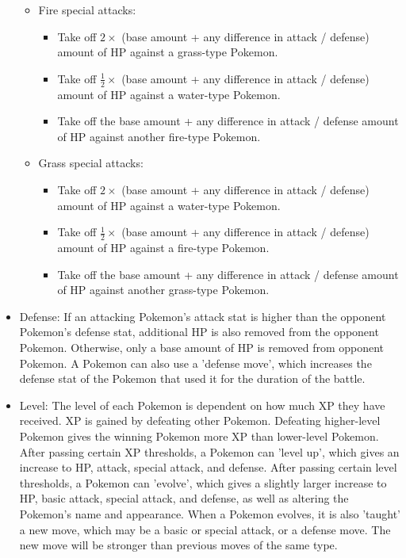 \documentclass{article}
\begin{document}
\begin{itemize}
\begin{itemize}
\begin{itemize}
          \end{itemize}
        \item Fire special attacks:
          \begin{itemize}
            \item Take off $2\times$ (base amount + any difference in attack / defense) amount of HP against a grass-type Pokemon.
            \item Take off $\frac{1}{2}\times{}$ (base amount + any difference in attack / defense) amount of HP against a water-type Pokemon.
            \item Take off the base amount + any difference in attack / defense amount of HP against another fire-type Pokemon.
          \end{itemize}
        \item Grass special attacks:
          \begin{itemize}
            \item Take off $2\times$ (base amount + any difference in attack / defense) amount of HP against a water-type Pokemon.
            \item Take off $\frac{1}{2}\times{}$ (base amount + any difference in attack / defense) amount of HP against a fire-type Pokemon.
            \item Take off the base amount + any difference in attack / defense amount of HP against another grass-type Pokemon.
          \end{itemize}
      \end{itemize}
    \item Defense: If an attacking Pokemon's attack stat is higher than the opponent Pokemon's defense stat, additional HP is also removed from the opponent Pokemon. Otherwise, only a base amount of HP is removed from opponent Pokemon. A Pokemon can also use a 'defense move', which increases the defense stat of the Pokemon that used it for the duration of the battle. 
    \item Level: The level of each Pokemon is dependent on how much XP they have received. XP is gained by defeating other Pokemon. Defeating higher-level Pokemon gives the winning Pokemon more XP than lower-level Pokemon. After passing certain XP thresholds, a Pokemon can 'level up', which gives an increase to HP, attack, special attack, and defense. After passing certain level thresholds, a Pokemon can 'evolve', which gives a slightly larger increase to HP, basic attack, special attack, and defense, as well as altering the Pokemon's name and appearance. When a Pokemon evolves, it is also 'taught' a new move, which may be a basic or special attack, or a defense move. The new move will be stronger than previous moves of the same type.
  \end{itemize}
  
\end{document}
